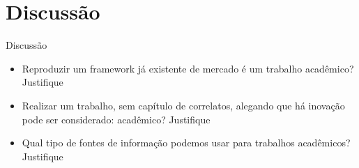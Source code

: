 \section{Discussão}

\begin{frame}
	\begin{block}{Discussão}
		\begin{itemize}
			\item Reproduzir um framework já existente de mercado é um trabalho acadêmico? Justifique
			\item Realizar um trabalho, sem capítulo de correlatos, alegando que há inovação pode ser considerado: acadêmico? Justifique
			\item Qual tipo de fontes de informação podemos usar para trabalhos acadêmicos?  Justifique
		\end{itemize}
	\end{block}
\end{frame}
